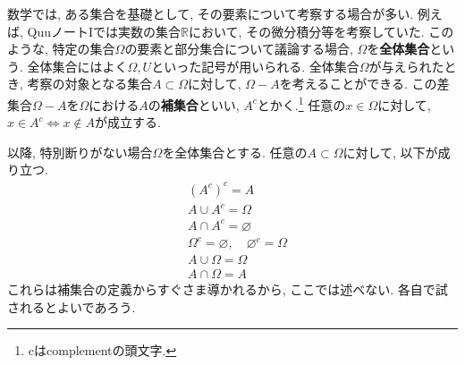 \documentclass[a4j,dvipdfmx]{jsarticle}
\numberwithin{equation}{section}
\begin{document}
            数学では, ある集合を基礎として, その要素について考察する場合が多い. 例えば, QuuノートIでは実数の集合$\mathbb{R}$において, その微分積分等を考察していた.
            このような, 特定の集合$\Omega$の要素と部分集合について議論する場合, $\varOmega$を\textbf{全体集合}という. 全体集合にはよく$\varOmega,U$といった記号が用いられる.
            全体集合$\varOmega$が与えられたとき, 考察の対象となる集合$A\subset \varOmega$に対して, $\varOmega - A$を考えることができる. 
            この差集合$\varOmega - A$を$\varOmega$における$A$の\textbf{補集合}といい, $A^c$とかく.\footnote{cはcomplementの頭文字.}
            任意の$x\in \varOmega$に対して, $x\in A^c \Leftrightarrow x\not\in A$が成立する.

            以降, 特別断りがない場合$\varOmega$を全体集合とする. 任意の$A\subset \varOmega$に対して, 以下が成り立つ.
            \begin{align}
                &(A^c)^c = A\\
                &A\cup A^c = \varOmega\\
                &A\cap A^c = \varnothing\\
                &\varOmega^c = \varnothing,\quad \varnothing^c = \varOmega\\
                &A\cup \varOmega=\varOmega\\
                &A\cap\varOmega=A
            \end{align}
            これらは補集合の定義からすぐさま導かれるから, ここでは述べない. 各自で試されるとよいであろう.
\end{document}
